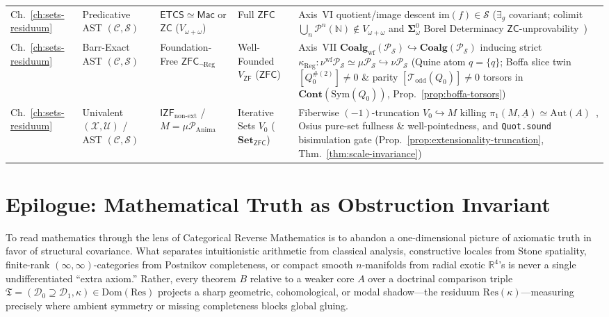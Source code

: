\documentclass[10pt,twoside,openright]{book}
\theoremstyle{crmplain}
\theoremstyle{crmdef}
\theoremstyle{crmremark}
\begin{document}
{\begin{xltabular}{\textwidth}{@{}P{0.11\textwidth}P{0.17\textwidth}P{0.18\textwidth}P{0.18\textwidth}Y@{}}
Ch.~\ref{ch:sets-residuum} & Predicative AST $(\mathcal{C}, \mathcal{S})$ & $\mathsf{ETCS} \simeq \mathsf{Mac}$ or $\mathsf{ZC}$ ($V_{\omega+\omega}$) & Full $\mathsf{ZFC}$ & Axis~VI quotient/image descent $\mathrm{im}(f) \in \mathcal{S}$ ($\exists_g$ covariant; colimit $\bigcup_n \mathcal{P}^n(\mathbb{N}) \notin V_{\omega+\omega}$ and $\boldsymbol{\Sigma}^0_\omega$ Borel Determinacy $\mathsf{ZC}$-unprovability~\cite{Friedman71}) \\
Ch.~\ref{ch:sets-residuum} & Barr-Exact AST $(\mathcal{C}, \mathcal{S})$ & Foundation-Free $\mathsf{ZFC}_{\neg\mathrm{Reg}}$ & Well-Founded $V_{\mathsf{ZF}}$ ($\mathsf{ZFC}$) & Axis~VII $\mathbf{Coalg}_{\mathrm{wf}}(\mathcal{P}_{\mathcal{S}}) \hookrightarrow \mathbf{Coalg}(\mathcal{P}_{\mathcal{S}})$ inducing strict $\kappa_{\mathrm{Reg}} : \nu^{\mathrm{wf}}\mathcal{P}_{\mathcal{S}} \simeq \mu\mathcal{P}_{\mathcal{S}} \hookrightarrow \nu\mathcal{P}_{\mathcal{S}}$ (Quine atom $q = \{q\}$; Boffa slice twin $[Q_0^{\#(2)}] \neq 0$ \& parity $[\mathcal{T}_{\mathrm{odd}}(Q_0)] \neq 0$ torsors in $\mathbf{Cont}(\mathrm{Sym}(Q_0))$, Prop.~\ref{prop:boffa-torsors}) \\
Ch.~\ref{ch:sets-residuum} & Univalent $(\mathcal{X}, \mathcal{U})$ / AST $(\mathcal{C}, \mathcal{S})$ & $\mathsf{IZF}_{\mathrm{non\text{-}ext}}$ / $M = \mu\mathcal{P}_{\mathrm{Anima}}$ & Iterative Sets $V_0$ ($\mathbf{Set}_{\mathsf{ZFC}}$) & Fiberwise $(-1)$-truncation $V_0 \hookrightarrow M$ killing $\pi_1(M, \underline{A}) \simeq \mathrm{Aut}(A)$~\cite{Gylterud18}, Osius pure-set fullness \& well-pointedness, and \texttt{Quot.sound} bisimulation gate (Prop.~\ref{prop:extensionality-truncation}, Thm.~\ref{thm:scale-invariance}) \\
\end{xltabular}\par}

\section{Epilogue: Mathematical Truth as Obstruction Invariant}\label{sec:epilogue-truth}

To read mathematics through the lens of Categorical Reverse Mathematics is to abandon a one-dimensional picture of axiomatic truth in favor of structural covariance. What separates intuitionistic arithmetic from classical analysis, constructive locales from Stone spatiality, finite-rank $(\infty,\infty)$-categories from Postnikov completeness, or compact smooth $n$-manifolds from radial exotic $\mathbb{R}^4$'s is never a single undifferentiated ``extra axiom.'' Rather, every theorem $B$ relative to a weaker core $A$ over a doctrinal comparison triple $\mathfrak{T} = (\mathcal{D}_0 \supseteq \mathcal{D}_1, \kappa) \in \mathrm{Dom}(\mathrm{Res})$ projects a sharp geometric, cohomological, or modal shadow---the residuum $\mathrm{Res}(\kappa)$---measuring precisely where ambient symmetry or missing completeness blocks global gluing.
\end{document}
